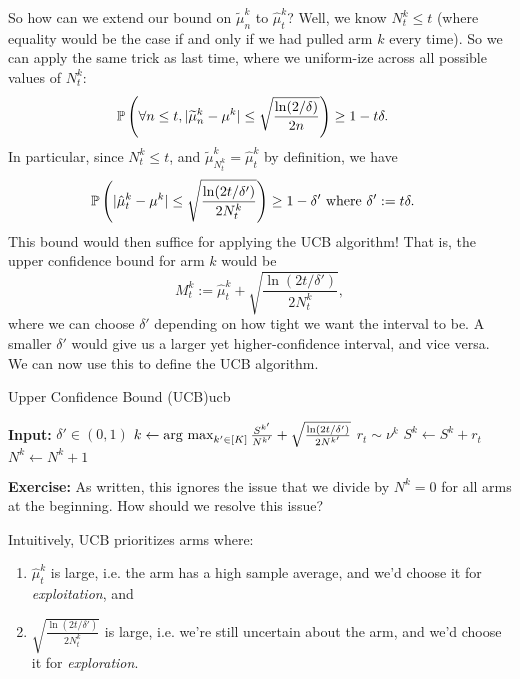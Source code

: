 \documentclass[\main/main]{subfiles}
\begin{document}
So how can we extend our bound on $\tilde\mu^k_n$ to $\hat \mu^k_t$? Well, we know $N^k_t \le t$ (where equality would be the case if and only if we had pulled arm $k$ every time). So we can apply the same trick as last time, where we uniform-ize across all possible values of $N^k_t$:
\begin{align*}
    \P\left( \forall n \le t, |\tilde \mu^k_n - \mu^k | \le \sqrt{\frac{\ln(2/\delta)}{2n}} \right) &\ge 1-t\delta.
\end{align*}
In particular, since $N^k_t \le t$, and $\tilde \mu^k_{N^k_t} = \hat \mu^k_t$ by definition, we have
\begin{align*}
    \P\left( |\hat \mu^k_t - \mu^k | \le \sqrt{\frac{\ln(2t/\delta')}{2N^k_t}} \right) &\ge 1-\delta' \text{ where } \delta' := t \delta.
\end{align*}
This bound would then suffice for applying the UCB algorithm! That is, the upper confidence bound for arm $k$ would be \[ M^k_t := \hat \mu^k_t + \sqrt{\frac{\ln(2t/\delta')}{2N^k_t}}, \] where we can choose $\delta'$ depending on how tight we want the interval to be. A smaller $\delta'$ would give us a larger yet higher-confidence interval, and vice versa. We can now use this to define the UCB algorithm.

\begin{definition}{Upper Confidence Bound (UCB)}{ucb}
\begin{algorithmic}
\State \textbf{Input:} $\delta' \in (0, 1)$
    \State $k \gets \argmax_{k' \in [K]} \frac{S^{k'}}{N^{k'}} + \sqrt{\frac{\ln(2t/\delta')}{2 N^{k'}}}$
    \State $r_t \sim \nu^k$
    \State $S^k \gets S^k + r_t$
    \State $N^k \gets N^k + 1$
\EndFor
\end{algorithmic}
\end{definition}

\textbf{Exercise:} As written, this ignores the issue that we divide by $N^k = 0$ for all arms at the beginning. How should we resolve this issue?

Intuitively, UCB prioritizes arms where:

\begin{enumerate}
    \item $\hat \mu^k_t$ is large, i.e. the arm has a high sample average, and we'd choose it for \emph{exploitation}, and
    \item $\sqrt{\frac{\ln(2t/\delta')}{2N^k_t}}$ is large, i.e. we're still uncertain about the arm, and we'd choose it for \emph{exploration}.
\end{enumerate}
\end{document}
